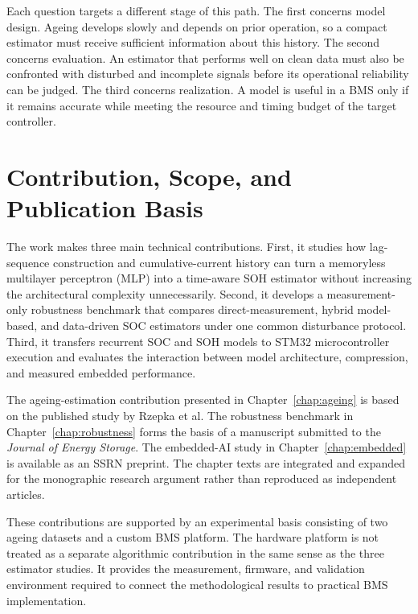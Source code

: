 \documentclass[
    a4paper,
    12pt,
    titlepage,
    bibliography=totoc,
    twoside=on,
    parskip=false,
    numbers=noenddot,
    cleardoublepage=empty,
    DIV=12,
    BCOR=12.0mm,
    headheight=36pt,
    headings=openright
]{scrreprt}
\begin{document}
Each question targets a different stage of this path. The first concerns model design. Ageing develops slowly and depends on prior operation, so a compact estimator must receive sufficient information about this history. The second concerns evaluation. An estimator that performs well on clean data must also be confronted with disturbed and incomplete signals before its operational reliability can be judged. The third concerns realization. A model is useful in a BMS only if it remains accurate while meeting the resource and timing budget of the target controller.

\section{Contribution, Scope, and Publication Basis}
The work makes three main technical contributions. First, it studies how lag-sequence construction and cumulative-current history can turn a memoryless multilayer perceptron (MLP) into a time-aware SOH estimator without increasing the architectural complexity unnecessarily. Second, it develops a measurement-only robustness benchmark that compares direct-measurement, hybrid model-based, and data-driven SOC estimators under one common disturbance protocol. Third, it transfers recurrent SOC and SOH models to STM32 microcontroller execution and evaluates the interaction between model architecture, compression, and measured embedded performance.

The ageing-estimation contribution presented in Chapter~\ref{chap:ageing} is based on the published study by Rzepka et al.\autocite{rzepkaNeuralNetworkArchitecture2023a} The robustness benchmark in Chapter~\ref{chap:robustness} forms the basis of a manuscript submitted to the \emph{Journal of Energy Storage}.\autocite{rzepkaPerformanceBenchmarkSubmitted2026} The embedded-AI study in Chapter~\ref{chap:embedded} is available as an SSRN preprint.\autocite{rzepkaEmbeddedArtificialIntelligence2026} The chapter texts are integrated and expanded for the monographic research argument rather than reproduced as independent articles.

These contributions are supported by an experimental basis consisting of two ageing datasets and a custom BMS platform. The hardware platform is not treated as a separate algorithmic contribution in the same sense as the three estimator studies. It provides the measurement, firmware, and validation environment required to connect the methodological results to practical BMS implementation.
\end{document}

